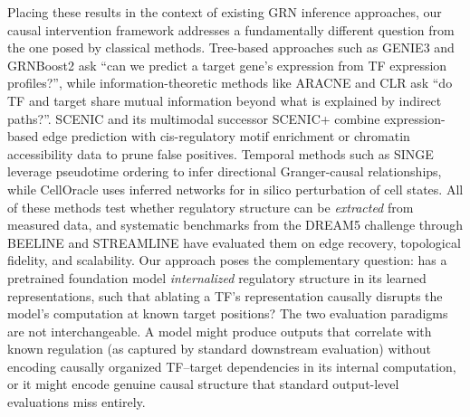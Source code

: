 \documentclass[10pt,letterpaper]{article}
\begin{document}
Placing these results in the context of existing GRN inference approaches, our
causal intervention framework addresses a fundamentally different question from
the one posed by classical methods. Tree-based approaches such as GENIE3
\cite{huynhthu_genie3_2010} and GRNBoost2 \cite{moerman_grnboost2_2019} ask
``can we predict a target gene's expression from TF expression profiles?'',
while information-theoretic methods like ARACNE \cite{margolin_aracne_2006}
and CLR \cite{faith_clr_2007} ask ``do TF and target share mutual information
beyond what is explained by indirect paths?''. SCENIC \cite{aibar_scenic_2017}
and its multimodal successor SCENIC+ \cite{bravo_scenicplus_2023} combine
expression-based edge prediction with cis-regulatory motif enrichment or
chromatin accessibility data to prune false positives. Temporal methods such
as SINGE \cite{deshpande_singe_2022} leverage pseudotime ordering to infer
directional Granger-causal relationships, while CellOracle
\cite{kamimoto_celloracle_2023} uses inferred networks for in silico
perturbation of cell states. All of these methods test whether regulatory
structure can be \textit{extracted} from measured data, and systematic
benchmarks from the DREAM5 challenge \cite{marbach_dream5_2012} through
BEELINE \cite{pratapa_beeline_2020} and STREAMLINE
\cite{stock_streamline_2024} have evaluated them on edge recovery, topological
fidelity, and scalability. Our approach poses the complementary question: has
a pretrained foundation model \textit{internalized} regulatory structure in
its learned representations, such that ablating a TF's representation causally
disrupts the model's computation at known target positions? The two evaluation
paradigms are not interchangeable. A model might produce outputs that correlate
with known regulation (as captured by standard downstream evaluation) without
encoding causally organized TF--target dependencies in its internal
computation, or it might encode genuine causal structure that standard
output-level evaluations miss entirely.
\end{document}
